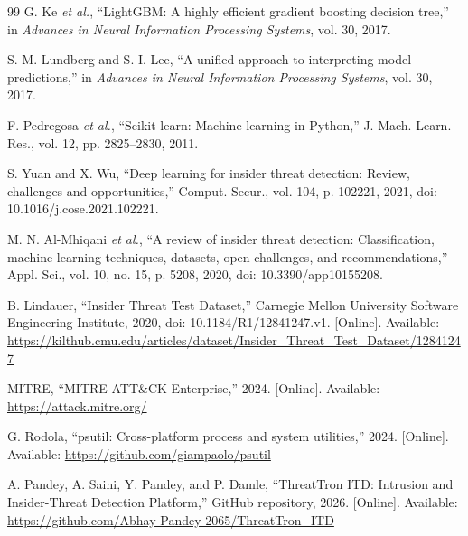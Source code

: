 \begin{thebibliography}{99}
G. Ke \textit{et al.}, ``LightGBM: A highly efficient gradient boosting decision tree,'' in \textit{Advances in Neural Information Processing Systems}, vol. 30, 2017.

S. M. Lundberg and S.-I. Lee, ``A unified approach to interpreting model predictions,'' in \textit{Advances in Neural Information Processing Systems}, vol. 30, 2017.

F. Pedregosa \textit{et al.}, ``Scikit-learn: Machine learning in Python,'' J. Mach. Learn. Res., vol. 12, pp. 2825--2830, 2011.

S. Yuan and X. Wu, ``Deep learning for insider threat detection: Review, challenges and opportunities,'' Comput. Secur., vol. 104, p. 102221, 2021, doi: 10.1016/j.cose.2021.102221.

M. N. Al-Mhiqani \textit{et al.}, ``A review of insider threat detection: Classification, machine learning techniques, datasets, open challenges, and recommendations,'' Appl. Sci., vol. 10, no. 15, p. 5208, 2020, doi: 10.3390/app10155208.

B. Lindauer, ``Insider Threat Test Dataset,'' Carnegie Mellon University Software Engineering Institute, 2020, doi: 10.1184/R1/12841247.v1. [Online]. Available: \url{https://kilthub.cmu.edu/articles/dataset/Insider_Threat_Test_Dataset/12841247}

MITRE, ``MITRE ATT\&CK Enterprise,'' 2024. [Online]. Available: \url{https://attack.mitre.org/}

G. Rodola, ``psutil: Cross-platform process and system utilities,'' 2024. [Online]. Available: \url{https://github.com/giampaolo/psutil}

A. Pandey, A. Saini, Y. Pandey, and P. Damle, ``ThreatTron ITD: Intrusion and Insider-Threat Detection Platform,'' GitHub repository, 2026. [Online]. Available: \url{https://github.com/Abhay-Pandey-2065/ThreatTron_ITD}

\end{thebibliography}

